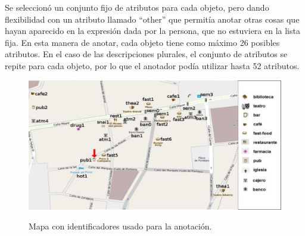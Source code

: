 Se seleccion\'o un conjunto fijo de atributos para cada objeto, pero dando flexibilidad con un atributo llamado ``other'' que permit\'ia anotar otras cosas que hayan aparecido en la expresi\'on dada por la persona, que no estuviera en la lista fija. En esta manera de anotar, cada objeto tiene como m\'aximo 26 posibles atributos.
En el caso de las descripciones plurales, el conjunto de atributos se repite para cada objeto, por lo que el anotador pod\'{i}a utilizar hasta 52 atributos.

\begin{figure}[t]
\centering
\includegraphics[width=.8\textwidth]{figures/ids.png}\\[0pt]
\caption{Mapa con identificadores usado para la anotaci\'on.}
\label{mapa-con-ids}
\end{figure}


